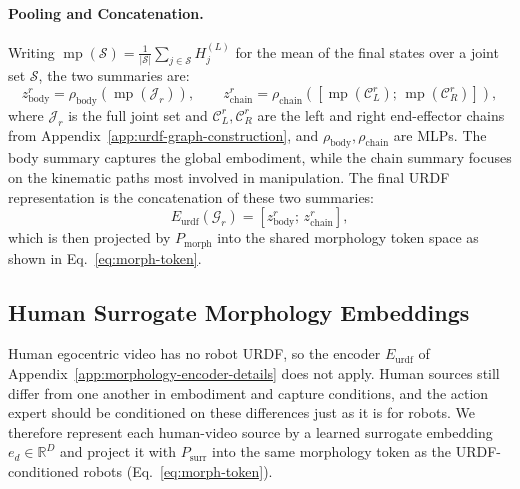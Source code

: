 \documentclass{llmxive}
\begin{document}
\paragraph{Pooling and Concatenation.}
Writing $\operatorname{mp}(\mathcal{S}) = \frac{1}{|\mathcal{S}|}\sum_{j \in \mathcal{S}} H^{(L)}_j$ for the mean of the final states over a joint set $\mathcal{S}$, the two summaries are:
\begin{equation}
    z_{\mathrm{body}}^{r} = \rho_{\mathrm{body}}\!\left(\operatorname{mp}(\mathcal{J}_r)\right),
    \qquad
    z_{\mathrm{chain}}^{r} = \rho_{\mathrm{chain}}\!\left(\left[\operatorname{mp}(\mathcal{C}^{r}_{L});\,\operatorname{mp}(\mathcal{C}^{r}_{R})\right]\right),
\end{equation}
where $\mathcal{J}_r$ is the full joint set and $\mathcal{C}^{r}_{L}, \mathcal{C}^{r}_{R}$ are the left and right end-effector chains from Appendix~\ref{app:urdf-graph-construction}, and $\rho_{\mathrm{body}}, \rho_{\mathrm{chain}}$ are MLPs. The body summary captures the global embodiment, while the chain summary focuses on the kinematic paths most involved in manipulation. The final URDF representation is the concatenation of these two summaries:
\begin{equation}
E_{\mathrm{urdf}}(\mathcal{G}_r) = \left[ z_{\mathrm{body}}^{r};\, z_{\mathrm{chain}}^{r} \right],
\end{equation}
which is then projected by $P_{\mathrm{morph}}$ into the shared morphology token space as shown in Eq.~\ref{eq:morph-token}.


\subsection{Human Surrogate Morphology Embeddings}
\label{app:human-surrogate-details}

Human egocentric video has no robot URDF, so the encoder $E_{\mathrm{urdf}}$ of Appendix~\ref{app:morphology-encoder-details} does not apply. Human sources still differ from one another in embodiment and capture conditions, and the action expert should be conditioned on these differences just as it is for robots. We therefore represent each human-video source by a learned surrogate embedding $e_{d} \in \mathbb{R}^{D}$ and project it with $P_{\mathrm{surr}}$ into the same morphology token as the URDF-conditioned robots (Eq.~\ref{eq:morph-token}).
\end{document}
